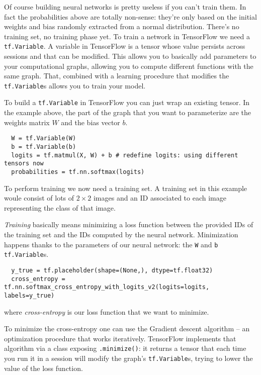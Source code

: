 Of course building neural networks is pretty useless if you can't train
them. In fact the probabilities above are totally non-sense: they're
only based on the initial weights and bias randomly extracted from a
normal distribution. There's no training set, no training phase yet. To
train a network in TensorFlow we need a \texttt{tf.Variable}. A
variable in TensorFlow is a tensor whose value persists across sessions
and that can be modified. This allows you to basically add parameters
to your computational graphs, allowing you to compute different
functions with the same graph. That, combined with a learning procedure
that modifies the \texttt{tf.Variable}s allows you to train your model.

To build a \texttt{tf.Variable} in TensorFlow you can just wrap an
existing tensor. In the example above, the part of the graph that you
want to parameterize are the weights matrix $W$ and the bias vector
$b$.

\begin{verbatim}
  W = tf.Variable(W)
  b = tf.Variable(b)
  logits = tf.matmul(X, W) + b # redefine logits: using different tensors now
  probabilities = tf.nn.softmax(logits)
\end{verbatim}

To perform training we now need a training set. A training set in this
example woule consist of lots of \(2 \times 2\) images and an ID
associated to each image representing the class of that image.

\emph{Training} basically means minimizing a loss function between the
provided IDs of the training set and the IDs computed by the neural
network. Minimization happens thanks to the parameters of our neural
network: the \texttt{W} and \texttt{b} \texttt{tf.Variable}s.

\begin{verbatim}
  y_true = tf.placeholder(shape=(None,), dtype=tf.float32)
  cross_entropy = tf.nn.softmax_cross_entropy_with_logits_v2(logits=logits, labels=y_true)
\end{verbatim}

where \emph{cross-entropy} is our loss function that we want to minimize.

To minimize the cross-entropy one can use the Gradient descent
algorithm -- an optimization procedure that works iteratively.
TensorFlow implements that algorithm via a class exposing
\texttt{.minimize()}: it returns a tensor that each time you run it in
a session will modify the graph's \texttt{tf.Variable}s, trying to
lower the value of the loss function.

